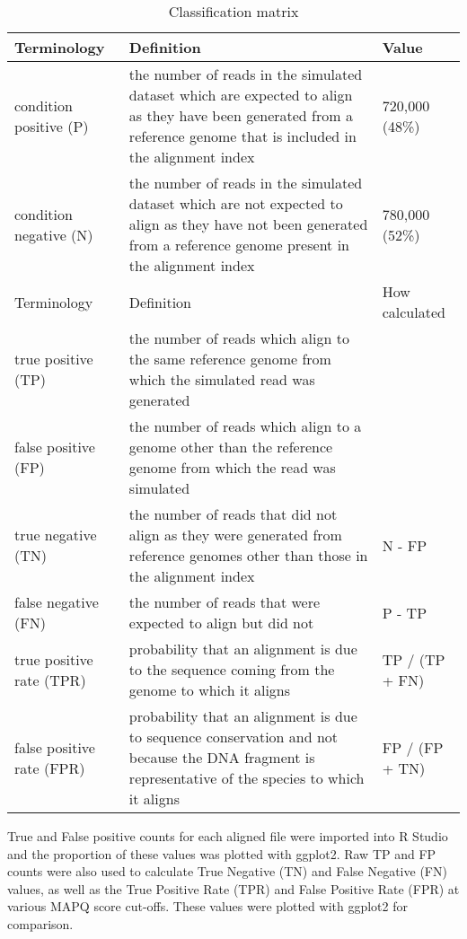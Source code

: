\documentclass[12pt, a4paper]{article}
\begin{document}
\begin{table}[ht]
\centering\small
\caption{Classification matrix}\label{Table:classificationMatrix}
\begin{tabular}{ C{2.5cm} L{9cm} C{3cm} }
	\toprule
	Terminology & Definition & Value \\
	\midrule
	condition positive (P) & the number of reads in the simulated dataset which are expected to align as they have been generated from a reference genome that is included in the alignment index & 720,000 (48\%) \\
	condition negative (N) & the number of reads in the simulated dataset which are not expected to align as they have not been generated from a reference genome present in the alignment index & 780,000 (52\%) \\
	\midrule
		Terminology & Definition & How calculated \\ 
	\midrule
	true positive (TP) & the number of reads which align to the same reference genome from which the simulated read was generated & \\
	false positive (FP) & the number of reads which align to a genome other than the reference genome from which the read was simulated & \\
	true negative (TN) & the number of reads that did not align as they were generated from reference genomes other than those in the alignment index & N - FP \\
	false negative (FN) & the number of reads that were expected to align but did not & P - TP \\
	true positive rate (TPR) & probability that an alignment is due to the sequence coming from the genome to which it aligns & TP / (TP + FN) \\
	false positive rate (FPR) & probability that an alignment is due to sequence conservation and not because the DNA fragment is representative of the species to which it aligns & FP / (FP + TN) \\
	\bottomrule
\end{tabular}
\end{table}

True and False positive counts for each aligned file were imported into R Studio and the proportion of these values was plotted with ggplot2. Raw TP and FP counts were also used to calculate True Negative (TN) and False Negative (FN) values, as well as the True Positive Rate (TPR) and False Positive Rate (FPR) at various MAPQ score cut-offs. These values were plotted with ggplot2 for comparison.   
\end{document}
